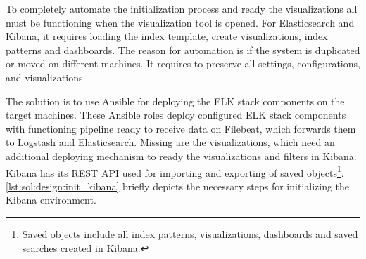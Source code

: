 \documentclass[12pt,a4paper,twoside]{book}
\begin{document}
                To completely automate the initialization process and ready the visualizations all must be functioning when the visualization tool is opened. For Elasticsearch and Kibana, it requires loading the index template, create visualizations, index patterns and dashboards. The reason for automation is if the system is duplicated or moved on different machines. It requires to preserve all settings, configurations, and visualizations.\par
                The solution is to use Ansible for deploying the ELK stack components on the target machines. These Ansible roles deploy configured ELK stack components with functioning pipeline ready to receive data on Filebeat, which forwards them to Logstash and Elasticsearch. Missing are the visualizations, which need an additional deploying mechanism to ready the visualizations and filters in Kibana. Kibana has its REST API used for importing and exporting of saved objects\footnote{Saved objects include all index patterns, visualizations, dashboards and saved searches created in Kibana.}. \autoref{lst:sol:design:init_kibana} briefly depicts the necessary steps for initializing the Kibana environment.                
                
                
\end{document}
